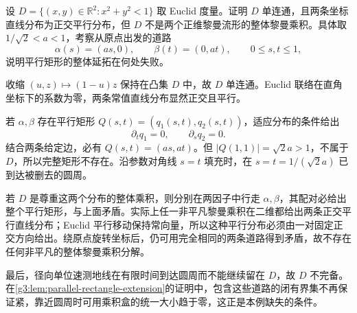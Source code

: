 \begin{exercise}\label{g3:ex:incomplete-disk-parallel-product}
	设 \(D=\{(x,y)\in\mathbb R^2:x^2+y^2<1\}\) 取 Euclid 度量。证明 \(D\) 单连通，且两条坐标直线分布为正交平行分布，但 \(D\) 不是两个正维黎曼流形的整体黎曼乘积。具体取 \(1/\sqrt2<a<1\)，考察从原点出发的道路
	\[
		\alpha(s)=(as,0),\qquad \beta(t)=(0,at),
		\qquad 0\le s,t\le1,
	\]
	说明平行矩形的整体延拓在何处失败。
\end{exercise}
\begin{solution}
	收缩 \((u,z)\mapsto(1-u)z\) 保持在凸集 \(D\) 中，故 \(D\) 单连通。Euclid 联络在直角坐标下的系数为零，两条常值直线分布显然正交且平行。

	若 \(\alpha,\beta\) 存在平行矩形 \(Q(s,t)=(q_1(s,t),q_2(s,t))\)，适应分布的条件给出
	\[
		\partial_tq_1=0,\qquad \partial_sq_2=0.
	\]
	结合两条给定边，必有 \(Q(s,t)=(as,at)\)。但
	\(|Q(1,1)|=\sqrt2a>1\)，不属于 \(D\)，所以完整矩形不存在。沿参数对角线 \(s=t\) 填充时，在 \(s=t=1/(\sqrt2a)\) 已到达被删去的圆周。

	若 \(D\) 是尊重这两个分布的整体乘积，则分别在两因子中行走 \(\alpha,\beta\)，其配对必给出整个平行矩形，与上面矛盾。实际上任一非平凡黎曼乘积在二维都给出两条正交平行直线分布；Euclid 平行移动保持常向量，所以这种平行分布必须由一对固定正交方向给出。绕原点旋转坐标后，仍可用完全相同的两条道路得到矛盾，故不存在任何非平凡的整体黎曼乘积分解。

	最后，径向单位速测地线在有限时间到达圆周而不能继续留在 \(D\)，故 \(D\) 不完备。在\cref{g3:lem:parallel-rectangle-extension}的证明中，包含这些道路的闭有界集不再保证紧，靠近圆周时可用乘积盒的统一大小趋于零，这正是本例缺失的条件。
\end{solution}

